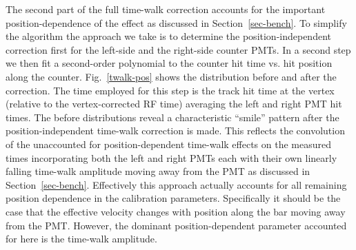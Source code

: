 \documentclass{elsart}
\begin{document}
The second part of the full time-walk correction accounts for the important position-dependence of the
effect as discussed in Section~\ref{sec-bench}. To simplify the algorithm the approach we take is to
determine the position-independent correction first for the left-side and the right-side counter PMTs.
In a second step we then fit a second-order polynomial to the counter hit time vs. hit position along the
counter. Fig.~\ref{twalk-pos} shows the distribution before and after the correction. The time employed
for this step is the track hit time at the vertex (relative to the vertex-corrected RF time) averaging the
left and right PMT hit times. The before distributions reveal a characteristic ``smile'' pattern after the
position-independent time-walk correction is made. This reflects the convolution of the unaccounted for
position-dependent time-walk effects on the measured times incorporating both the left and right PMTs
each with their own linearly falling time-walk amplitude moving away from the PMT as discussed in
Section~\ref{sec-bench}. Effectively this approach actually accounts for all remaining position dependence
in the calibration parameters. Specifically it should be the case that the effective velocity changes with
position along the bar moving away from the PMT. However, the dominant position-dependent parameter
accounted for here is the time-walk amplitude.
\end{document}
